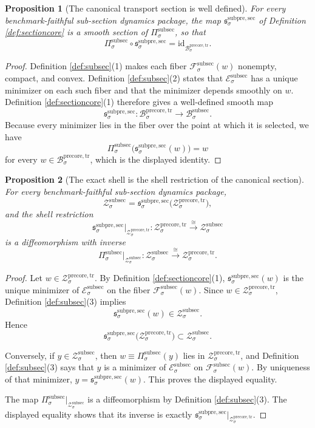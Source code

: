 \documentclass[11pt]{article}
\newcommand{\PreCoreTrBody}[1]{\mathcal B_{#1}^{\mathrm{precore,tr}}}
\newcommand{\PreCoreTrShell}[1]{\mathcal Z_{#1}^{\mathrm{precore,tr}}}
\newcommand{\SubPreSection}[1]{\mathfrak s_{#1}^{\mathrm{subpre,sec}}}
\newcommand{\SubSectionBody}[1]{\mathcal B_{#1}^{\mathrm{subsec}}}
\newcommand{\SubSectionProj}[1]{\Pi_{#1}^{\mathrm{subsec}}}
\newcommand{\SubSectionFunctional}[1]{\mathscr E_{#1}^{\mathrm{subsec}}}
\newcommand{\SubSectionFiber}[2]{\mathcal F_{#1}^{\mathrm{subsec}}(#2)}
\newcommand{\SubSectionShell}[1]{\mathcal Z_{#1}^{\mathrm{subsec}}}
\newtheorem{proposition}{Proposition}
\begin{document}
\begin{proposition}[The canonical transport section is well defined]
\label{prop:section}
For every benchmark-faithful sub-section dynamics package, the map \(\SubPreSection{\sigma}\) of Definition \ref{def:sectioncore} is a smooth section of \(\SubSectionProj{\sigma}\), so that
\[
\SubSectionProj{\sigma}\circ\SubPreSection{\sigma}
=
\mathrm{id}_{\PreCoreTrBody{\sigma}}.
\]
\end{proposition}

\begin{proof}
Definition \ref{def:subsec}(1) makes each fiber \(\SubSectionFiber{\sigma}{w}\) nonempty, compact, and convex. Definition \ref{def:subsec}(2) states that \(\SubSectionFunctional{\sigma}\) has a unique minimizer on each such fiber and that the minimizer depends smoothly on \(w\). Definition \ref{def:sectioncore}(1) therefore gives a well-defined smooth map
\[
\SubPreSection{\sigma}:\PreCoreTrBody{\sigma}\to\SubSectionBody{\sigma}.
\]
Because every minimizer lies in the fiber over the point at which it is selected, we have
\[
\SubSectionProj{\sigma}\bigl(\SubPreSection{\sigma}(w)\bigr)=w
\]
for every \(w\in\PreCoreTrBody{\sigma}\), which is the displayed identity.
\end{proof}

\begin{proposition}[The exact shell is the shell restriction of the canonical section]
\label{prop:shell}
For every benchmark-faithful sub-section dynamics package,
\[
\SubSectionShell{\sigma}
=
\SubPreSection{\sigma}\bigl(\PreCoreTrShell{\sigma}\bigr),
\]
and the shell restriction
\[
\SubPreSection{\sigma}\big|_{\PreCoreTrShell{\sigma}}
:
\PreCoreTrShell{\sigma}\xrightarrow{\cong}\SubSectionShell{\sigma}
\]
is a diffeomorphism with inverse
\[
\SubSectionProj{\sigma}\big|_{\SubSectionShell{\sigma}}
:
\SubSectionShell{\sigma}\xrightarrow{\cong}\PreCoreTrShell{\sigma}.
\]
\end{proposition}

\begin{proof}
Let \(w\in\PreCoreTrShell{\sigma}\). By Definition \ref{def:sectioncore}(1), \(\SubPreSection{\sigma}(w)\) is the unique minimizer of \(\SubSectionFunctional{\sigma}\) on the fiber \(\SubSectionFiber{\sigma}{w}\). Since \(w\in\PreCoreTrShell{\sigma}\), Definition \ref{def:subsec}(3) implies
\[
\SubPreSection{\sigma}(w)\in\SubSectionShell{\sigma}.
\]
Hence
\[
\SubPreSection{\sigma}\bigl(\PreCoreTrShell{\sigma}\bigr)\subset\SubSectionShell{\sigma}.
\]

Conversely, if \(y\in\SubSectionShell{\sigma}\), then \(w\equiv\SubSectionProj{\sigma}(y)\) lies in \(\PreCoreTrShell{\sigma}\), and Definition \ref{def:subsec}(3) says that \(y\) is a minimizer of \(\SubSectionFunctional{\sigma}\) on \(\SubSectionFiber{\sigma}{w}\). By uniqueness of that minimizer, \(y=\SubPreSection{\sigma}(w)\). This proves the displayed equality.

The map \(\SubSectionProj{\sigma}\big|_{\SubSectionShell{\sigma}}\) is a diffeomorphism by Definition \ref{def:subsec}(3). The displayed equality shows that its inverse is exactly \(\SubPreSection{\sigma}\big|_{\PreCoreTrShell{\sigma}}\).
\end{proof}
\end{document}
